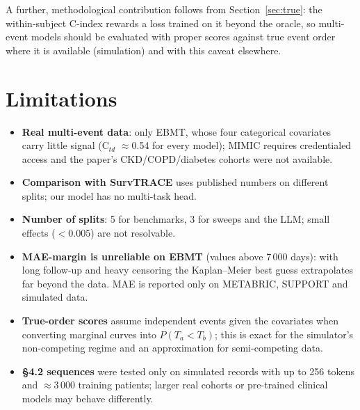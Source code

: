 \documentclass[11pt,a4paper]{article}
\newcommand{\Ctd}{C$_{td}$}
\begin{document}
A further, methodological contribution follows from Section~\ref{sec:true}: the within-subject C-index rewards a loss
trained on it beyond the oracle, so multi-event models should be evaluated with proper scores against true event order
where it is available (simulation) and with this caveat elsewhere.

\section{Limitations}\label{sec:limits}
\begin{itemize}
  \item \textbf{Real multi-event data}: only EBMT, whose four categorical covariates carry little signal (\Ctd{}
        $\approx$0.54 for every model); MIMIC requires credentialed access and the paper's CKD/COPD/diabetes cohorts
        were not available.
  \item \textbf{Comparison with SurvTRACE} uses published numbers on different splits; our model has no multi-task
        head.
  \item \textbf{Number of splits}: 5 for benchmarks, 3 for sweeps and the LLM; small effects ($<0.005$) are not
        resolvable.
  \item \textbf{MAE-margin is unreliable on EBMT} (values above 7\,000 days): with long follow-up and heavy
        censoring the Kaplan--Meier best guess extrapolates far beyond the data. MAE is reported only on METABRIC,
        SUPPORT and simulated data.
  \item \textbf{True-order scores} assume independent events given the covariates when converting marginal curves into
        $P(T_a<T_b)$; this is exact for the simulator's non-competing regime and an approximation for semi-competing data.
  \item \textbf{\S4.2 sequences} were tested only on simulated records with up to 256 tokens and $\approx$3\,000
        training patients; larger real cohorts or pre-trained clinical models may behave differently.
\end{itemize}

\end{document}
